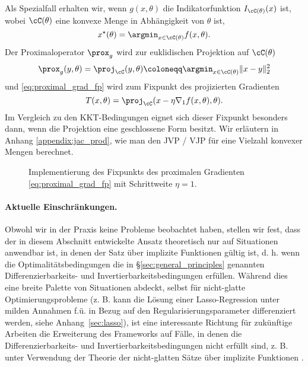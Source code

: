 Als Spezialfall erhalten wir, wenn $g(x, \theta)$ die Indikatorfunktion $I_{\cC(\theta)}(x)$ ist, wobei $\cC(\theta)$ eine konvexe Menge in Abhängigkeit von $\theta$ ist,
\begin{equation}
x^\star(\theta) = \argmin_{x \in \cC(\theta)} f(x, \theta).
\label{eq:constrained_pb}
\end{equation}
Der Proximaloperator $\prox_g$ wird zur euklidischen Projektion auf $\cC(\theta)$
\begin{equation}
\prox_g(y, \theta) =
\proj_{\cC}(y, \theta) \coloneqq
\argmin_{x \in \cC(\theta)} \|x - y \|^2_2
\label{eq:projection}
\end{equation}
und \eqref{eq:proximal_grad_fp} wird zum Fixpunkt des projizierten Gradienten
\begin{equation}
T(x, \theta) = \proj_{\cC}(x - \eta \nabla_1 f(x, \theta), \theta).
\label{eq:proj_grad_fp}
\end{equation}
Im Vergleich zu den KKT-Bedingungen eignet sich dieser Fixpunkt besonders dann, wenn die Projektion eine geschlossene Form besitzt.
Wir erläutern in Anhang \ref{appendix:jac_prod}, wie man den JVP / VJP für eine Vielzahl konvexer Mengen berechnet. 

\begin{figure}[t]
\centering
{}
\caption{Implementierung des Fixpunkts des proximalen Gradienten \eqref{eq:proximal_grad_fp} mit Schrittweite $\eta=1$.}
\label{fig:pg_fixed_point}
\end{figure}

\paragraph{Aktuelle Einschränkungen.}

Obwohl wir in der Praxis keine Probleme beobachtet haben, stellen wir fest, dass der in diesem Abschnitt entwickelte Ansatz theoretisch nur auf Situationen anwendbar ist, in denen der Satz über implizite Funktionen gültig ist, d. h. wenn die Optimalitätsbedingungen die in \S\ref{sec:general_principles} genannten Differenzierbarkeits- und Invertierbarkeitsbedingungen erfüllen. Während dies eine breite Palette von Situationen abdeckt, selbst für nicht-glatte Optimierungsprobleme (z. B. kann die Lösung einer Lasso-Regression unter milden Annahmen f.ü. in Bezug auf den Regularisierungsparameter differenziert werden, siehe Anhang~\ref{sec:lasso}), ist eine interessante Richtung für zukünftige Arbeiten die Erweiterung des Frameworks auf Fälle, in denen die Differenzierbarkeits- und Invertierbarkeitsbedingungen nicht erfüllt sind, z. B. unter Verwendung der Theorie der nicht-glatten Sätze über implizite Funktionen \cite{Clarke1983Optimization,Bolte2021Nonsmooth}.

